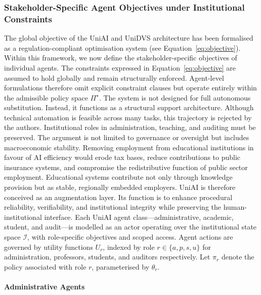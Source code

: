 \documentclass[oneside,10pt]{swissi}
\begin{document}
\subsubsection{Stakeholder-Specific Agent Objectives under Institutional Constraints}

The global objective of the UniAI and UniDVS architecture has been formalised as a regulation-compliant optimisation system (see Equation~\ref{eq:objective}). Within this framework, we now define the stakeholder-specific objectives of individual agents. The constraints expressed in Equation~\ref{eq:objective} are assumed to hold globally and remain structurally enforced. Agent-level formulations therefore omit explicit constraint clauses but operate entirely within the admissible policy space $\Pi^\star$. The system is not designed for full autonomous substitution. Instead, it functions as a structural support architecture. Although technical automation is feasible across many tasks, this trajectory is rejected by the authors. Institutional roles in administration, teaching, and auditing must be preserved. The argument is not limited to governance or oversight but includes macroeconomic stability. Removing employment from educational institutions in favour of AI efficiency would erode tax bases, reduce contributions to public insurance systems, and compromise the redistributive function of public sector employment. Educational systems contribute not only through knowledge provision but as stable, regionally embedded employers. UniAI is therefore conceived as an augmentation layer. Its function is to enhance procedural reliability, verifiability, and institutional integrity while preserving the human-institutional interface. Each UniAI agent class—administrative, academic, student, and audit—is modelled as an actor operating over the institutional state space $\mathcal{I}$, with role-specific objectives and scoped access. Agent actions are governed by utility functions $U_r$, indexed by role $r \in \{a, p, s, u\}$ for administration, professors, students, and auditors respectively. Let $\pi_r$ denote the policy associated with role $r$, parameterised by $\theta_r$.

\paragraph{Administrative Agents}
\end{document}
